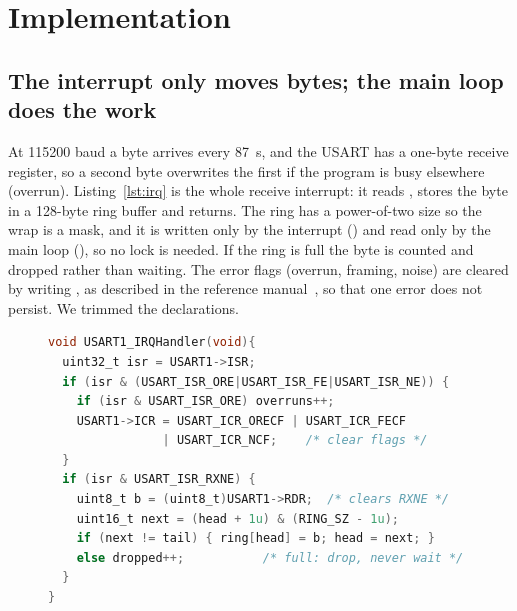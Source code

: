 \section{Implementation}
\label{sec:impl}

\subsection{The interrupt only moves bytes; the main loop does the work}
At 115200 baud a byte arrives every 87~\textmu s, and the USART has a one-byte receive register, so a second byte overwrites the first
if the program is busy elsewhere (overrun). Listing~\ref{lst:irq} is the whole receive interrupt: it reads ,
stores the byte in a 128-byte ring buffer and returns. The ring has a power-of-two size so the wrap is a mask, and it is written
only by the interrupt () and read only by the main loop (), so no lock is needed. If the ring is full the
byte is counted and dropped rather than waiting. The error flags (overrun, framing, noise) are cleared by writing , as described in the reference manual~\cite{rm0091}, so that one error does not persist.
We trimmed the declarations.

\begin{figure}[t]
\begin{lstlisting}[float=false,language=C, caption={Receive interrupt and ring buffer (\texttt{uart.c}, trimmed).}, label=lst:irq]
void USART1_IRQHandler(void){
  uint32_t isr = USART1->ISR;
  if (isr & (USART_ISR_ORE|USART_ISR_FE|USART_ISR_NE)) {
    if (isr & USART_ISR_ORE) overruns++;
    USART1->ICR = USART_ICR_ORECF | USART_ICR_FECF
                | USART_ICR_NCF;    /* clear flags */
  }
  if (isr & USART_ISR_RXNE) {
    uint8_t b = (uint8_t)USART1->RDR;  /* clears RXNE */
    uint16_t next = (head + 1u) & (RING_SZ - 1u);
    if (next != tail) { ring[head] = b; head = next; }
    else dropped++;           /* full: drop, never wait */
  }
}
\end{lstlisting}
\end{figure}

